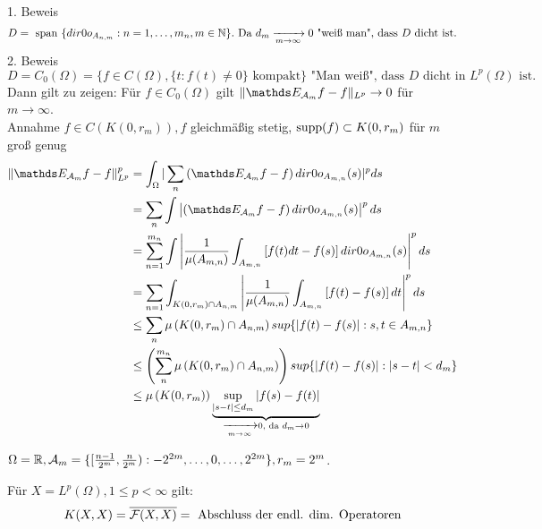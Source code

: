 \begin{beweis}
	1. Beweis
	\[ D = \text{ span }\{ \1_{A_{n, m}} : n = 1, \dotsc, m_{n}, m \in \MdN \}. \text{ Da } d_{m} \xrightarrow[m \rightarrow \infty]{} 0 \text{ "wei{\ss} man", dass } D \text{ dicht ist.} \]
	2. Beweis
	\[ D = C_{0}(\Omega) = \{ f \in C(\Omega), \{ t: f(t) \neq 0 \} \text{ kompakt} \} \text{ "Man wei{\ss}", dass } D \text{ dicht in } L^{p}(\Omega) \text{ ist.} \]
	Dann gilt zu zeigen: Für $f \in C_{0}(\Omega)$ gilt $\| \EW_{\ca_{m}} f - f \|_{L^{p}} \rightarrow 0$ für $m \rightarrow \infty$. \\
		Annahme $f \in C(K(0, r_{m})), f$ gleichmä{\ss}ig stetig, $\operatorname{supp}(f) \subset K(0, r_{m})$ für $m$ gro{\ss} genug
	\begin{align*}
		\| \EW_{\ca_{m}} f - f \|_{L^{p}}^{p} & =  \int_{\Omega} | \sum_{n} \left( \EW_{\ca_{m}} f - f \right) \1_{A_{m, n}}(s) |^{p} ds \\
		& = \sum_{n} \int \left| \left( \EW_{\ca_{m}} f - f \right) \1_{A_{m, n}}(s) \right|^{p} ds	 \\
		& = \sum_{n = 1}^{m_{n}} \int \left| \frac{1}{\mu(A_{m, n})} \int_{A_{m,n }} \left[ f(t) dt - f(s) \right] \1_{A_{m, n}}(s) \right|^{p} ds \\
		& = \sum_{n = 1} \int_{K(0, r_{m}) \cap A_{n, m}} \left| \frac{1}{\mu(A_{m, n})} \int_{A_{m,n }} \left[ f(t) - f(s) \right] dt \right|^{p} ds \\
		& \leq \sum_{n} \mu\left( K(0, r_{m}) \cap A_{n, m} \right) sup \{ \left| f(t) - f(s) \right| : s, t \in A_{m, n} \} \\
		& \leq \left( \sum_{n}^{m_{n}} \mu\left( K(0, r_{m}) \cap A_{n, m} \right) \right) sup \{ \left| f(t) - f(s) \right| : | s - t| < d_{m} \} \\
		& \leq \mu\left( K(0, r_{m}) \right) \underbrace{\sup_{|s - t| \leq d_{m}} |f(s) - f(t)|}_{\xrightarrow[m \rightarrow \infty]{} 0, \text{ da } d_{m} \rightarrow 0}
	\end{align*}
\end{beweis}


\begin{beispiel*}
	$ \Omega = \mathbb{R}, \mathcal{A}_{m} = \{ [\frac{n - 1}{2^{m}}, \frac{n}{2^{m}}): -2^{2m}, \dotsc, 0, \dotsc, 2^{2m} \}, r_{m} = 2^{m}$.
\end{beispiel*}


\begin{kor*} 
	Für $X = L^{p}(\Omega), 1 \leq p < \infty$ gilt:
	\[ K(X, X) = \overline{\mathcal{F}(X, X)} = \text{ Abschluss der endl. dim. Operatoren} \]
\end{kor*}

